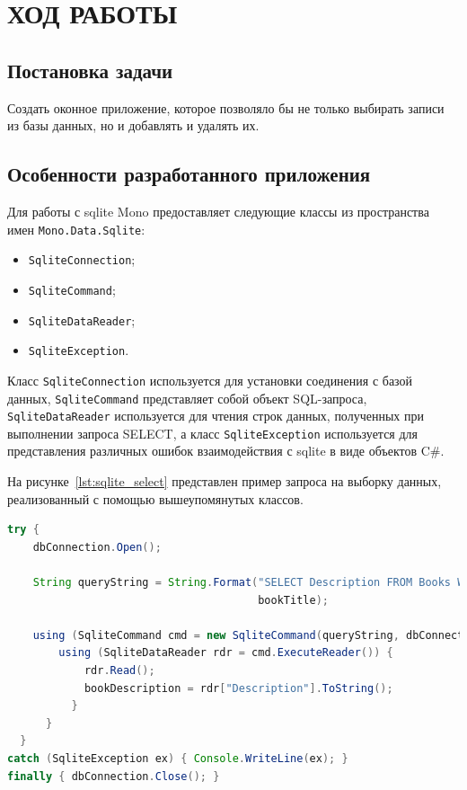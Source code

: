 \section{ХОД РАБОТЫ}

\subsection{Постановка задачи}

Создать оконное приложение, которое позволяло бы не только
выбирать записи из базы данных, но и добавлять и удалять их.

\subsection{Особенности разработанного приложения}

Для работы с sqlite Mono предоставляет следующие классы из пространства имен
\texttt{Mono.Data.Sqlite}:

\begin{itemize}
\item \texttt{SqliteConnection};
\item \texttt{SqliteCommand};
\item \texttt{SqliteDataReader};
\item \texttt{SqliteException}.
\end{itemize}

Класс \texttt{SqliteConnection} используется для установки соединения с базой данных,
\texttt{SqliteCommand} представляет собой объект SQL-запроса, 
\texttt{SqliteDataReader} используется для чтения строк данных, 
полученных при выполнении запроса SELECT, а класс \texttt{SqliteException}
используется для представления различных ошибок взаимодействия с sqlite в виде объектов C\#. 

На рисунке~\ref{lst:sqlite_select} представлен пример запроса на выборку данных,
реализованный с помощью вышеупомянутых классов.

\begin{lstlisting}[caption=Пример запроса на выборку данных,
label=lst:sqlite_select,language={Java},basicstyle=\scriptsize\ttfamily]
try {        
    dbConnection.Open();

    String queryString = String.Format("SELECT Description FROM Books WHERE Title='{0}'",
                                       bookTitle);
        
    using (SqliteCommand cmd = new SqliteCommand(queryString, dbConnection)) {
        using (SqliteDataReader rdr = cmd.ExecuteReader()) {
            rdr.Read();
            bookDescription = rdr["Description"].ToString();
          }
      }
  }
catch (SqliteException ex) { Console.WriteLine(ex); }
finally { dbConnection.Close(); }
\end{lstlisting}

